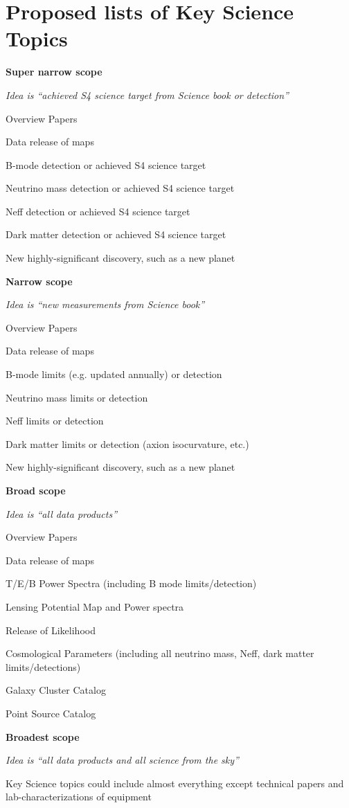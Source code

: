 \documentclass[12pt]{article}
\newcommand{\Comment}[1]{\textcolor{Blue}{(Comment: #1)}}
\begin{document}
\section*{Proposed lists of Key Science Topics}

\textbf{Super narrow scope}

\noindent\textit{Idea is ``achieved S4 science target from Science book or detection''}

Overview Papers

Data release of maps

B-mode detection or achieved S4 science target

Neutrino mass detection or achieved S4 science target

Neff detection or achieved S4 science target

Dark matter detection or achieved S4 science target 

New highly-significant discovery, such as a new planet

\vskip 10pt
\noindent\textbf{Narrow scope} 

\noindent\textit{Idea is ``new measurements from Science book''}

Overview Papers

Data release of maps

B-mode limits (e.g. updated annually) or detection

Neutrino mass limits or detection

Neff limits or detection

Dark matter limits or detection (axion isocurvature, etc.)

New highly-significant discovery, such as a new planet

\vskip 10pt
\noindent\textbf{Broad scope}

\noindent\textit{Idea is ``all data products''}

Overview Papers

Data release of maps

T/E/B Power Spectra (including B mode limits/detection)

Lensing Potential Map and Power spectra

Release of Likelihood

Cosmological Parameters (including all neutrino mass, Neff, dark matter limits/detections)

Galaxy Cluster Catalog

Point Source Catalog

\vskip 10pt
\noindent\textbf{Broadest scope}

\noindent\textit{Idea is ``all data products and all science from the sky''}

Key Science topics could include almost everything except technical papers and lab-characterizations of equipment
\end{document}
